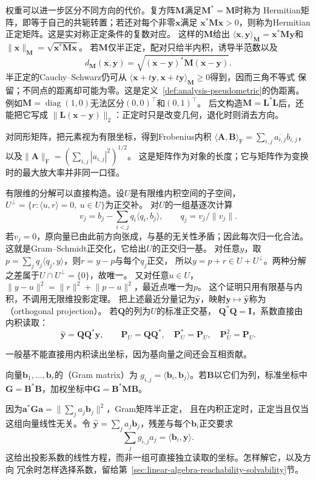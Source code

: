 权重可以进一步区分不同方向的代价。复方阵$\bm M$满足$\bm M^*=\bm M$时称为
Hermitian矩阵，即等于自己的共轭转置；若还对每个非零$\bm x$满足
$\bm x^*\bm M\bm x>0$，则称为Hermitian正定矩阵。这是实对称正定条件的复数对应。
这样的$\bm M$给出
$\langle\bm x,\bm y\rangle_{\bm M}=\bm x^*\bm M\bm y$和
$\lVert\bm x\rVert_{\bm M}=\sqrt{\bm x^*\bm M\bm x}$。
若$\bm M$仅半正定，配对只给半内积，诱导半范数以及
\begin{equation}
 d_{\bm M}(\bm x,\bm y)
 =\sqrt{(\bm x-\bm y)^*\bm M(\bm x-\bm y)}.
 \label{eq:linear-algebra-mahalanobis-pseudodistance}
\end{equation}
半正定的Cauchy--Schwarz仍可从
$\langle\bm x+t\bm y,\bm x+t\bm y\rangle_{\bm M}\geq0$得到，因而三角不等式
保留；不同点的距离却可能为零。这是定义~\ref{def:analysis-pseudometric}的伪距离。
例如$\bm M=\operatorname{diag}(1,0)$无法区分$(0,0)^\top$和$(0,1)^\top$。
后文构造$\bm M=\bm L^*\bm L$后，还能把它写成
$\lVert\bm L(\bm x-\bm y)\rVert_2$：正定时只是改变几何，退化时则消去方向。

对同形矩阵，把元素视为有限坐标，得到Frobenius内积
$\langle\bm A,\bm B\rangle_{\mathrm F}=\sum_{i,j}\overline{a_{i,j}}b_{i,j}$，
以及$\lVert\bm A\rVert_{\mathrm F}=(\sum_{i,j}|a_{i,j}|^2)^{1/2}$。
这是矩阵作为对象的长度；它与矩阵作为变换时的最大放大率并非同一口径。


有限维的分解可以直接构造。设$U$是有限维内积空间的子空间，
$U^\perp=\{r:\langle u,r\rangle=0,\ u\in U\}$为正交补。
对$U$的一组基逐次计算
\[
 v_j=b_j-\sum_{i<j}q_i\langle q_i,b_j\rangle,\qquad q_j=v_j/\lVert v_j\rVert.
\]
若$v_j=0$，原向量已由此前方向张成，与基的无关性矛盾；因此每次归一化合法。
这就是Gram--Schmidt正交化，它给出$U$的正交归一基。
对任意$y$，取$p=\sum_j q_j\langle q_j,y\rangle$，则$r=y-p$与每个$q_j$正交，
所以$y=p+r\in U+U^\perp$。两种分解之差属于$U\cap U^\perp=\{0\}$，故唯一。
又对任意$u\in U$，
$\lVert y-u\rVert^2=\lVert r\rVert^2+\lVert p-u\rVert^2$，最近点唯一为$p$。
这个证明只用有限基与内积，不调用无限维投影定理。
把上述最近分量记为$\widehat{\bm y}$，映射$\bm y\mapsto\widehat{\bm y}$称为
（orthogonal projection）。
若$\bm Q$的列为$U$的标准正交基，
$\bm Q^*\bm Q=\bm I$，系数直接由内积读取：
\begin{equation}
 \widehat{\bm y}=\bm Q\bm Q^*\bm y,\qquad
 \bm P_U=\bm Q\bm Q^*,\quad \bm P_U^*=\bm P_U,\quad\bm P_U^2=\bm P_U.
 \label{eq:linear-algebra-orthogonal-projector}
\end{equation}

一般基不能直接用内积读出坐标，因为基向量之间还会互相贡献。
\begin{definition}[有限向量族的Gram矩阵]
\label{def:linear-algebra-gram-matrix}
向量$\bm b_1,\ldots,\bm b_r$的（Gram matrix）为
$g_{i,j}=\langle\bm b_i,\bm b_j\rangle$。若$\bm B$以它们为列，标准坐标中
$\bm G=\bm B^*\bm B$，加权坐标中$\bm G=\bm B^*\bm M\bm B$。
\end{definition}
因为$\bm a^*\bm G\bm a=\lVert\sum_j a_j\bm b_j\rVert^2$，Gram矩阵半正定，
且在内积正定时，正定当且仅当这组向量线性无关。令
$\widehat{\bm y}=\sum_j a_j\bm b_j$，残差与每个$\bm b_i$正交要求
\[
 \sum_j g_{i,j}a_j=\langle\bm b_i,\bm y\rangle.
\]
这给出投影系数的线性方程，而非一组可直接独立读取的坐标。怎样解它，以及方向
冗余时怎样选择系数，留给第~\ref{sec:linear-algebra-reachability-solvability}节。

